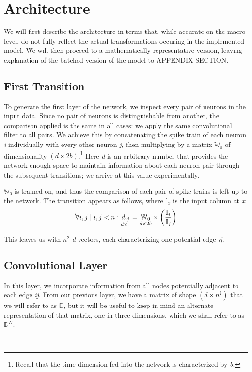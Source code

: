 \section{Architecture}
We will first describe the architecture in terms that, while accurate on the 
macro level, do not fully reflect the actual transformations occuring in the 
implemented model. We will then proceed to a mathematically representative 
version, leaving explanation of the batched version of the model to APPENDIX 
SECTION.

\subsection{First Transition}
To generate the first layer of the network, we inspect every pair of neurons in 
the input data. Since no pair of neurons is distinguishable from another, the 
comparison applied is the same in all cases: we apply the same convolutional 
filter to all pairs. We achieve this by concatenating the spike train of each 
neuron \textit{i} individually with every other neuron \textit{j}, then 
multiplying by a matrix $\mathbb{W}_0$ of dimensionality $(d \times 
2b)$.\footnote{Recall that the time dimension fed into the network is 
characterized by \textit{b}.}  Here \textit{d} is an arbitrary number that 
provides the network enough space to maintain information about each neuron pair 
through the subsequent transitions; we arrive at this value experimentally.

$\mathbb{W}_0$ is trained on, and thus the comparison of each pair of spike 
trains is left up to the network. The transition appears as follows, where 
$\mathbb{I}_x$ is the input column at \textit{x}:
\[
	\mathlarger\forall i,j \mid i,j < n: \underset{d \times 1}{d_{ij}} = 
	\underset{d \times 2b}{\mathbb{W}_0} \times 
	\left(\frac{\mathbb{I}_i}{\mathbb{I}_j}\right)
\]

This leaves us with $n^2$ \textit{d}-vectors, each characterizing one potential 
edge \textit{ij}.

\subsection{Convolutional Layer}
In this layer, we incorporate information from all nodes potentially adjacent to 
each edge \textit{ij}. From our previous layer, we have a matrix of shape $(d 
\times n^2)$ that we will refer to as $\mathbb{D}$, but it will be useful to 
keep in mind an alternate representation of that matrix, one in three 
dimensions, which we shall refer to as $\mathbb{D}^N$.

\\

